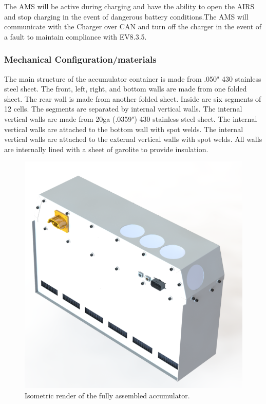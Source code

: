 \documentclass{article}
\begin{document}
	The AMS will be active during charging and have the ability to open the AIRS and stop charging in the event of dangerous battery conditions.The AMS will communicate with the Charger over CAN and turn off the charger in the event of a fault to maintain compliance with EV8.3.5. 
	
	

\subsubsection{Mechanical Configuration/materials}\label{accumulator_mechanical_configuration}


The main structure of the accumulator container is made from .050" 430 stainless steel sheet. The front, left, right, and bottom walls are made from one folded sheet. The rear wall is made from another folded sheet. Inside are six segments of 12 cells. The segments are separated by internal vertical walls. The internal vertical walls are made from 20ga (.0359") 430 stainless steel sheet. The internal vertical walls are attached to the bottom wall with spot welds. The internal vertical walls are attached to the external vertical walls with spot welds. All walls are internally lined with a sheet of garolite to provide insulation.

\begin{figure}[H]
\centering
\includegraphics[width=1\textwidth]{accumulator_2_iso}
\caption{Isometric render of the fully assembled accumulator. }
\label{fig:accumulator}
\end{figure}
\end{document}
